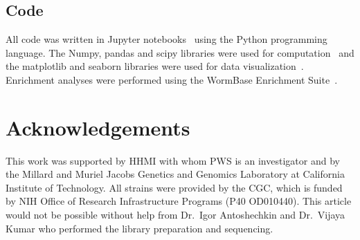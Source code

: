 \documentclass[10pt, onecolumn]{article}
\begin{document}
\subsection*{Code}
All code was written in Jupyter notebooks~\cite{Perez2007} using the Python
programming language. The Numpy, pandas and scipy libraries were used for
computation~\cite{VanDerWalt2011,McKinney2011,Oliphant2007} and the matplotlib
and seaborn libraries were used for data visualization~\cite{Hunter2007,Waskom}.
Enrichment analyses were performed using the WormBase Enrichment
Suite~\cite{Angeles-Albores2016}.


\section*{Acknowledgements}
This work was supported by HHMI with whom PWS is an investigator and by the
Millard and Muriel Jacobs Genetics and Genomics Laboratory at California
Institute of Technology. All strains were provided by the CGC, which is funded
by NIH Office of Research Infrastructure Programs (P40 OD010440). This article
would not be possible without help from Dr.\ Igor Antoshechkin and Dr.\ Vijaya
Kumar who performed the library preparation and sequencing.




\end{document}
